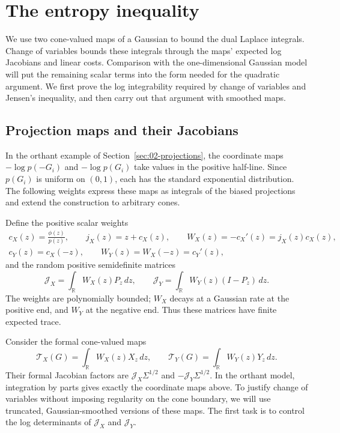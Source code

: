 \section{The entropy inequality}\label{sec:03-entropy}

We use two cone-valued maps of a Gaussian to bound the dual Laplace
integrals. Change of variables bounds these integrals through the maps' expected
log Jacobians and linear costs. Comparison with the one-dimensional
Gaussian model will put the remaining scalar terms into the form needed
for the quadratic argument.
We first prove the log integrability required by change of variables
and Jensen's inequality, and then carry out that argument with
smoothed maps.

\subsection{Projection maps and their Jacobians}
In the orthant example of Section~\ref{sec:02-projections}, the
coordinate maps $-\log p(-G_i)$ and $-\log p(G_i)$ take values in the
positive half-line. Since $p(G_i)$ is uniform on $(0,1)$, each has the
standard exponential distribution. The following weights express
these maps as integrals of the biased projections and extend the
construction to arbitrary cones.

Define the positive scalar weights
\[
\begin{gathered}
c_X(z)=\frac{\phi(z)}{p(z)},\qquad j_X(z)=z+c_X(z),\qquad
W_X(z)=-c_X'(z)=j_X(z)c_X(z),\\
c_Y(z)=c_X(-z),\qquad W_Y(z)=W_X(-z)=c_Y'(z),
\end{gathered}
\]
and the random positive semidefinite matrices
\[
\mathcal J_X=\int_{\mathbb R}W_X(z)P_z\,dz,\qquad
\mathcal J_Y=\int_{\mathbb R}W_Y(z)(I-P_z)\,dz.
\]
The weights are polynomially bounded; \(W_X\) decays at a Gaussian rate at the positive end, and \(W_Y\) at the negative end. Thus these matrices have finite expected trace.


Consider the formal cone-valued maps
\[
 \mathcal T_X(G)=\int_{\mathbb R}W_X(z)X_z\,dz,
 \qquad
 \mathcal T_Y(G)=\int_{\mathbb R}W_Y(z)Y_z\,dz.
\]
Their formal Jacobian factors are
$\mathcal J_X\Sigma^{1/2}$ and $-\mathcal J_Y\Sigma^{1/2}$. In the orthant model, integration by
parts gives exactly the coordinate maps above. To justify change
of variables without imposing regularity on the cone boundary, we
will use truncated, Gaussian-smoothed versions of these maps.
The first task is to control the log determinants of
$\mathcal J_X$ and $\mathcal J_Y$.

